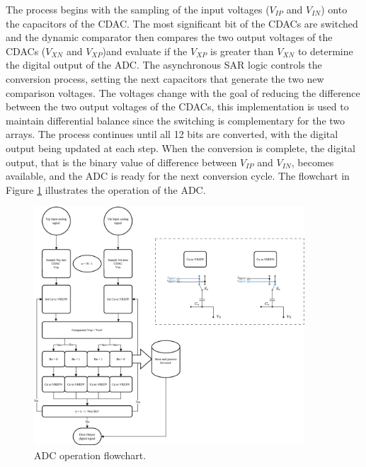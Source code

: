 The process begins with the sampling of the input voltages ($V_{IP}$ and $V_{IN}$) onto the capacitors of the CDAC. The most significant bit of the CDACs are switched and the dynamic comparator then compares the two output voltages of the CDACs ($V_{XN}$ and $V_{XP}$)and evaluate if the $V_{XP}$ is greater than $V_{XN}$ to determine the digital output of the ADC. 
The asynchronous SAR logic controls the conversion process, setting the next capacitors that generate the two new comparison voltages. The voltages change with the goal of reducing the difference between the two output voltages of the CDACs, this implementation is used to maintain differential balance since the switching is complementary for the two arrays.
The process continues until all 12 bits are converted, with the digital output being updated at each step. When the conversion is complete, the digital output, that is the binary value of difference between $V_{IP}$ and $V_{IN}$, becomes available, and the ADC is ready for the next conversion cycle. The flowchart in Figure \ref{fig:ADC-flowchart} illustrates the operation of the ADC.
\begin{figure}[H]
    \centering
    \includegraphics[width=0.9\textwidth]{Images/operation_ADC.png}
    \caption{ADC operation flowchart.}
    \label{fig:ADC-flowchart}
\end{figure}

